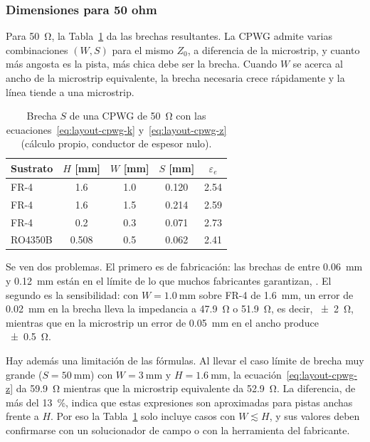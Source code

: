 \subsubsection{Dimensiones para 50 ohm}

Para \SI{50}{\ohm}, la Tabla~\ref{tab:layout-cpwg} da las brechas resultantes. La CPWG admite varias combinaciones $(W, S)$ para el mismo $Z_0$, a diferencia de la microstrip, y cuanto más angosta es la pista, más chica debe ser la brecha. Cuando $W$ se acerca al ancho de la microstrip equivalente, la brecha necesaria crece rápidamente y la línea tiende a una microstrip.

\begin{table}[H]
  \centering
  \caption[Brecha de una CPWG de 50 ohm (cálculo propio).]{Brecha $S$ de una CPWG de \SI{50}{\ohm} con las ecuaciones~\eqref{eq:layout-cpwg-k} y~\eqref{eq:layout-cpwg-z} (cálculo propio, conductor de espesor nulo).}\label{tab:layout-cpwg}
  \begin{tabular}{@{}lcccc@{}}
    \toprule
    Sustrato & $H$ [mm] & $W$ [mm] & $S$ [mm] & $\varepsilon_e$ \\
    \midrule
    FR-4    & \num{1,6}   & \num{1,0} & \num{0,120} & \num{2,54} \\
    FR-4    & \num{1,6}   & \num{1,5} & \num{0,214} & \num{2,59} \\
    FR-4    & \num{0,2}   & \num{0,3} & \num{0,071} & \num{2,73} \\
    RO4350B & \num{0,508} & \num{0,5} & \num{0,062} & \num{2,41} \\
    \bottomrule
  \end{tabular}
\end{table}

Se ven dos problemas. El primero es de fabricación: las brechas de entre \SI{0,06}{\milli\metre} y \SI{0,12}{\milli\metre} están en el límite de lo que muchos fabricantes garantizan, . El segundo es la sensibilidad: con $W = \SI{1,0}{\milli\metre}$ sobre FR-4 de \SI{1,6}{\milli\metre}, un error de \SI{0,02}{\milli\metre} en la brecha lleva la impedancia a \SI{47,9}{\ohm} o \SI{51,9}{\ohm}, es decir, \SI{\pm2}{\ohm}, mientras que en la microstrip un error de \SI{0,05}{\milli\metre} en el ancho produce \SI{\pm0,5}{\ohm}.

Hay además una limitación de las fórmulas. Al llevar el caso límite de brecha muy grande ($S = \SI{50}{\milli\metre}$) con $W = \SI{3}{\milli\metre}$ y $H = \SI{1,6}{\milli\metre}$, la ecuación~\eqref{eq:layout-cpwg-z} da \SI{59,9}{\ohm} mientras que la microstrip equivalente da \SI{52,9}{\ohm}. La diferencia, de más del \SI{13}{\percent}, indica que estas expresiones son aproximadas para pistas anchas frente a $H$. Por eso la Tabla~\ref{tab:layout-cpwg} solo incluye casos con $W \lesssim H$, y sus valores deben confirmarse con un solucionador de campo o con la herramienta del fabricante.


